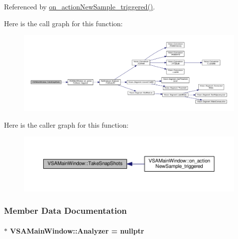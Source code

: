 Referenced by \hyperlink{vsamainwindow_8cpp_source_l00361}{on\+\_\+action\+New\+Sample\+\_\+triggered()}.



Here is the call graph for this function\+:
\nopagebreak
\begin{figure}[H]
\begin{center}
\leavevmode
\includegraphics[width=350pt]{class_v_s_a_main_window_aed2fd5f5e0a932f8de7751d144ee74fe_cgraph}
\end{center}
\end{figure}




Here is the caller graph for this function\+:
\nopagebreak
\begin{figure}[H]
\begin{center}
\leavevmode
\includegraphics[width=350pt]{class_v_s_a_main_window_aed2fd5f5e0a932f8de7751d144ee74fe_icgraph}
\end{center}
\end{figure}




\subsubsection{Member Data Documentation}
\hypertarget{class_v_s_a_main_window_a15db0a815b5c9abb5b8ea1bae21e17c9}{}
\paragraph[{Analyzer}]{$\ast$ V\+S\+A\+Main\+Window\+::\+Analyzer = nullptr\hspace{0.3cm}{\ttfamily [private]}}\label{class_v_s_a_main_window_a15db0a815b5c9abb5b8ea1bae21e17c9}


